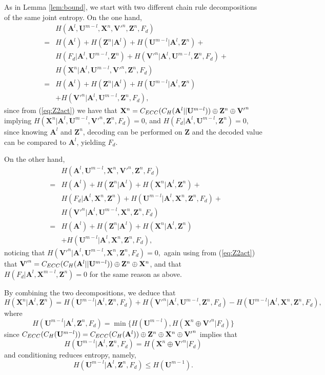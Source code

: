 \documentclass{article}[11pt]
\newcommand{\am}{\mathbf{A}}
\newcommand{\um}{\mathbf{U}}
\newcommand{\vm}{\mathbf{V}}
\newcommand{\xm}{\mathbf{X}}
\newcommand{\zm}{\mathbf{Z}}
\newenvironment{proof}{\noindent {\bf Proof. \ }}{\hfill \vrule height 2pt depth 4pt width 6pt\par\noindent}
\begin{document}
\begin{proof}
As in Lemma \ref{lem:bound}, we start with two different chain rule decompositions
of the same joint entropy. On the one hand,
\begin{eqnarray*}
& & H(\am^l,\um^{m-l},\xm^n,{\vm'}^n,\zm^n, F_d) \\
&=& H(\am^l) + H(\zm^n|\am^l) + H(\um^{m-l}|\am^l,\zm^n)+\\
& & H(F_d|\am^l,\um^{m-l},\zm^n) + H({\vm'}^n|\am^l,\um^{m-l},\zm^n, F_d) + \\
& & H(\xm^n|\am^l,\um^{m-l},{\vm'}^n,\zm^n, F_d)\\
&=& H(\am^l) + H(\zm^n|\am^l) + H(\um^{m-l}|\am^l,\zm^n)\\
& & + H({\vm'}^n|\am^l,\um^{m-l},\zm^n, F_d),
\end{eqnarray*}
since from (\ref{eq:Z2act}) we have that ${\bf X}^n = C_{ECC}(C_H({\bf A}^l||{\bf U}^{m-l}))\oplus{\bf Z}^n
\oplus{{\bf V}'}^n$ implying $H(\xm^n|\am^l,\um^{m-l},{\vm'}^n,\zm^n, F_d)=0$, and
$H(F_d|\am^l,\um^{m-l},\zm^n)=0$, since knowing $\am^l$ and $\zm^n$, decoding can be performed on $\zm$ and the decoded value can be compared to $\am^l$, yielding $F_d$.

On the other hand,
\begin{eqnarray*}
& & H(\am^l,\um^{m-l},\xm^n,{\vm'}^n,\zm^n, F_d) \\
&=& H(\am^l) + H(\zm^n|\am^l) + H(\xm^n|\am^l,\zm^n)+\\
& & H(F_d|\am^l,\xm^n,\zm^n) + H(\um^{m-l}|\am^l,\xm^n,\zm^n, F_d) + \\
& & H({\vm'}^n|\am^l,\um^{m-l},\xm^n,\zm^n, F_d)\\
&=& H(\am^l) + H(\zm^n|\am^l) + H(\xm^n|\am^l,\zm^n)\\
& & + H(\um^{m-l}|\am^l,\xm^n,\zm^n, F_d),
\end{eqnarray*}
noticing that $H({\vm'}^n|\am^l,\um^{m-l},\xm^n,\zm^n, F_d)=0,$ again
using from (\ref{eq:Z2act}) that ${{\bf V}'}^n = C_{ECC}(C_H({\bf A}^l||{\bf U}^{m-l}))\oplus{\bf Z}^n
\oplus{\bf X}^n$, and that $H(F_d|\am^l,\xm^{m-l},\zm^n)=0$ for the same reason as above.

By combining the two decompositions, we deduce that
\begin{equation}\label{eq:hxaz}
H(\xm^n|\am^l,\zm^n)
= H(\um^{m-l}|\am^l,\zm^n,F_d) + H({\vm'}^n|\am^l,\um^{m-l},\zm^n, F_d)
 - H(\um^{m-l}|\am^l,\xm^n,\zm^n, F_d),
\end{equation}
where
\[
H(\um^{m-l}|\am^l,\zm^n, F_d) =  \min \{H(\um^{m-l}), H(\xm^n\oplus{\vm'}^n|F_d) \}
\]
since $C_{ECC}(C_H({\bf U}^{m-l}))=C_{ECC}(C_H({\bf A}^l))\oplus{\bf Z}^n
\oplus{\bf X}^n\oplus {{\bf V}'}^n$ implies that
\[
H(\um^{m-l}|\am^l,\zm^n, F_d) =H(\xm^n\oplus{\vm'}^n|F_d)
\]
and conditioning reduces entropy, namely,
\[
H(\um^{m-l}|\am^l,\zm^n, F_d)\leq H(\um^{m-1}).
\]


\end{proof}
\end{document}
